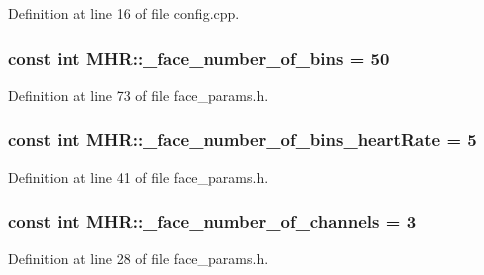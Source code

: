 Definition at line 16 of file config.\+cpp.

\hypertarget{namespace_m_h_r_a2c4c769eba572cf1388059c68e02804a}{
\subsubsection[{\+\_\+face\+\_\+number\+\_\+of\+\_\+bins}]{\setlength{\rightskip}{0pt plus 5cm}const int M\+H\+R\+::\+\_\+face\+\_\+number\+\_\+of\+\_\+bins = 50}}\label{namespace_m_h_r_a2c4c769eba572cf1388059c68e02804a}


Definition at line 73 of file face\+\_\+params.\+h.

\hypertarget{namespace_m_h_r_abfcdcdfbf5694a70c871df5484e30321}{
\subsubsection[{\+\_\+face\+\_\+number\+\_\+of\+\_\+bins\+\_\+heart\+Rate}]{\setlength{\rightskip}{0pt plus 5cm}const int M\+H\+R\+::\+\_\+face\+\_\+number\+\_\+of\+\_\+bins\+\_\+heart\+Rate = 5}}\label{namespace_m_h_r_abfcdcdfbf5694a70c871df5484e30321}


Definition at line 41 of file face\+\_\+params.\+h.

\hypertarget{namespace_m_h_r_a1af8c23e0ffae759111c964d2369a13b}{
\subsubsection[{\+\_\+face\+\_\+number\+\_\+of\+\_\+channels}]{\setlength{\rightskip}{0pt plus 5cm}const int M\+H\+R\+::\+\_\+face\+\_\+number\+\_\+of\+\_\+channels = 3}}\label{namespace_m_h_r_a1af8c23e0ffae759111c964d2369a13b}


Definition at line 28 of file face\+\_\+params.\+h.

